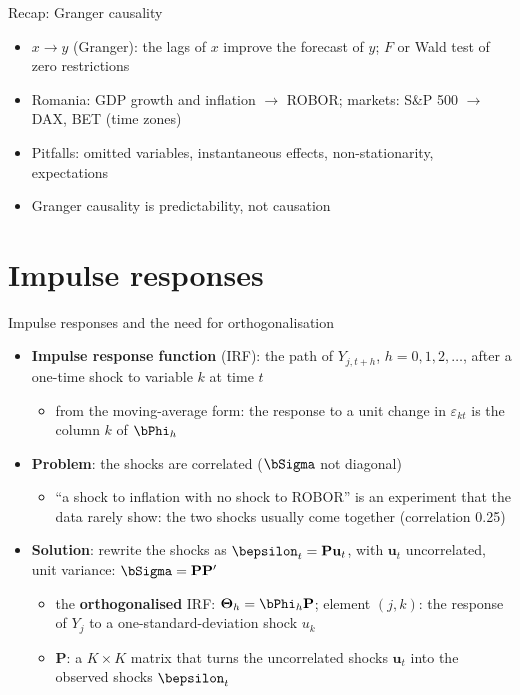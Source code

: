 \begin{frame}{Recap: Granger causality}
\itemsize{\small}
\begin{itemize}
    \item $x \to y$ (Granger): the lags of $x$ improve the forecast of $y$; $F$ or Wald test of zero restrictions
    \item Romania: GDP growth and inflation $\to$ ROBOR; markets: S\&P 500 $\to$ DAX, BET (time zones)
    \item Pitfalls: omitted variables, instantaneous effects, non-stationarity, expectations
    \item Granger causality is predictability, not causation
\end{itemize}
\end{frame}


\section{Impulse responses}

\begin{frame}{Impulse responses and the need for orthogonalisation}
\itemsize{\small}
\begin{itemize}
    \item \textbf{Impulse response function} (IRF): the path of $Y_{j,t+h}$, $h = 0, 1, 2, \dots$, after a one-time shock to variable $k$ at time $t$
    \begin{itemize}
        \item from the moving-average form: the response to a unit change in $\varepsilon_{kt}$ is the column $k$ of $\bPhi_h$
    \end{itemize}
    \item \textbf{Problem}: the shocks are correlated ($\bSigma$ not diagonal)
    \begin{itemize}
        \item ``a shock to inflation with no shock to ROBOR'' is an experiment that the data rarely show: the two shocks usually come together (correlation 0.25)
    \end{itemize}
    \item \textbf{Solution}: rewrite the shocks as $\bepsilon_t = \mathbf{P}\mathbf{u}_t$, with $\mathbf{u}_t$ uncorrelated, unit variance: $\bSigma = \mathbf{P}\mathbf{P}'$
    \begin{itemize}
        \item the \textbf{orthogonalised} IRF: $\boldsymbol{\Theta}_h = \bPhi_h\mathbf{P}$; element $(j, k)$: the response of $Y_j$ to a one-standard-deviation shock $u_k$
        \item $\mathbf{P}$: a $K \times K$ matrix that turns the uncorrelated shocks $\mathbf{u}_t$ into the observed shocks $\bepsilon_t$
    \end{itemize}
\end{itemize}
\end{frame}

